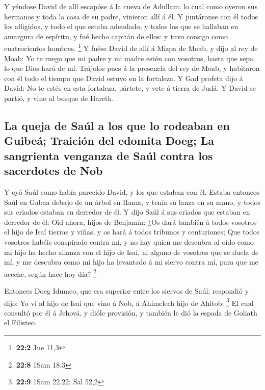 Y yéndose David de allí escapóse á la cueva de Adullam;
lo cual como oyeron sus hermanos y toda la casa de su padre, vinieron
allí á él.  Y juntáronse con él todos los afligidos, y
todo el que estaba adeudado, y todos los que se hallaban en amargura de
espíritu, y fué hecho capitán de ellos: y tuvo consigo como
cuatrocientos hombres. \footnote{\textbf{22:2} Jue 11,3} 
Y fuése David de allí á Mizpa de Moab, y dijo al rey de Moab: Yo te
ruego que mi padre y mi madre estén con vosotros, hasta que sepa lo que
Dios hará de mí.  Trájolos pues á la presencia del rey de
Moab, y habitaron con él todo el tiempo que David estuvo en la
fortaleza.  Y Gad profeta dijo á David: No te estés en
esta fortaleza, pártete, y vete á tierra de Judá. Y David se partió, y
vino al bosque de Hareth.

\hypertarget{la-queja-de-sauxfal-a-los-que-lo-rodeaban-en-guibeuxe1-traiciuxf3n-del-edomita-doeg-la-sangrienta-venganza-de-sauxfal-contra-los-sacerdotes-de-nob}{%
\subsection{La queja de Saúl a los que lo rodeaban en Guibeá; Traición
del edomita Doeg; La sangrienta venganza de Saúl contra los sacerdotes
de
Nob}\label{la-queja-de-sauxfal-a-los-que-lo-rodeaban-en-guibeuxe1-traiciuxf3n-del-edomita-doeg-la-sangrienta-venganza-de-sauxfal-contra-los-sacerdotes-de-nob}}

 Y oyó Saúl como había parecido David, y los que estaban
con él. Estaba entonces Saúl en Gabaa debajo de un árbol en Rama, y
tenía su lanza en su mano, y todos sus criados estaban en derredor de
él.  Y dijo Saúl á sus criados que estaban en derredor de
él: Oid ahora, hijos de Benjamín: ¿Os dará también á todos vosotros el
hijo de Isaí tierras y viñas, y os hará á todos tribunos y centuriones;
 Que todos vosotros habéis conspirado contra mí, y no hay
quien me descubra al oído como mi hijo ha hecho alianza con el hijo de
Isaí, ni alguno de vosotros que se duela de mí, y me descubra como mi
hijo ha levantado á mi siervo contra mí, para que me aceche, según hace
hoy día? \footnote{\textbf{22:8} 1Sam 18,3}

 Entonces Doeg Idumeo, que era superior entre los siervos
de Saúl, respondió y dijo: Yo vi al hijo de Isaí que vino á Nob, á
Ahimelech hijo de Ahitob; \footnote{\textbf{22:9} 1Sam 22,22; Sal 52,2}
 El cual consultó por él á Jehová, y dióle provisión, y
también le dió la espada de Goliath el Filisteo.

